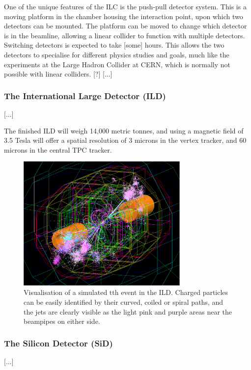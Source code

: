 One of the unique features of the ILC is the push-pull detector system. This is a moving platform in the chamber housing the interaction point, upon which two detectors can be mounted. The platform can be moved to change which detector is in the beamline, allowing a linear collider to function with multiple detectors. Switching detectors is expected to take [some] hours. This allows the two detectors to specialise for different physics studies and goals, much like the experiments at the Large Hadron Collider at CERN, which is normally not possible with linear colliders. [?] [...]

\subsubsection{The International Large Detector (ILD)}
[...]

The finished ILD will weigh 14,000 metric tonnes, and using a magnetic field of 3.5 Tesla will offer a spatial resolution of 3 microns in the vertex tracker, and 60 microns in the central TPC tracker. 

\begin{figure}[h]
	\centering
	\includegraphics[width=0.75\textwidth]{../Pictures/SimulatedEvent1.png}
	\caption{Visualisation of a simulated tth event in the ILD. Charged particles can be easily identified by their curved, coiled or spiral paths, and the jets are clearly visible as the light pink and purple areas near the beampipes on either side.}
	\label{figure:colliders/ILD/tth-simulation}
\end{figure}

\subsubsection{The Silicon Detector (SiD)}
[...]

